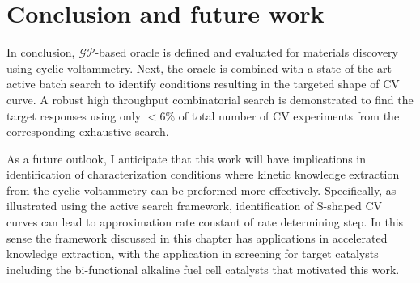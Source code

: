


\section{Conclusion and future work}
In conclusion, \(\mathcal{GP}\)-based oracle is defined and evaluated for materials discovery using cyclic voltammetry.
Next, the oracle is combined with a state-of-the-art active batch search to identify conditions resulting in the targeted shape of CV curve. 
A robust high throughput combinatorial search is demonstrated to find the target responses using only \(<6\%\) of total number of CV experiments from the corresponding exhaustive search. 

As a future outlook, I anticipate that this work will have implications in identification of characterization conditions where kinetic knowledge extraction from the cyclic voltammetry can be preformed more effectively. 
Specifically, as illustrated using the active search framework, identification of S-shaped CV curves can lead to approximation rate constant of rate determining step. 
In this sense the framework discussed in this chapter has applications in accelerated knowledge extraction, with the application in screening for target catalysts including the bi-functional alkaline fuel cell catalysts that motivated this work.


